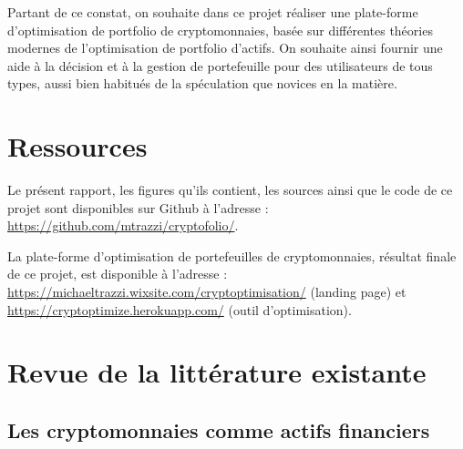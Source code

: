 \documentclass[a4paper, 10pt]{article}
\begin{document}
Partant de ce constat, on souhaite dans ce projet réaliser une plate-forme d’optimisation de portfolio de cryptomonnaies, basée sur différentes théories modernes de l'optimisation de portfolio d'actifs. On souhaite ainsi fournir une aide à la décision et à la gestion de portefeuille pour des utilisateurs de tous types, aussi bien habitués de la spéculation que novices en la matière.

\section*{Ressources}
\label{sec:ressources}

Le présent rapport, les figures qu'ils contient, les sources ainsi que le code de ce projet sont disponibles sur Github à l'adresse : \url{https://github.com/mtrazzi/cryptofolio/}.

La plate-forme d'optimisation de portefeuilles de cryptomonnaies, résultat finale de ce projet, est disponible à l'adresse : \url{https://michaeltrazzi.wixsite.com/cryptoptimisation/} (landing page) et \url{https://cryptoptimize.herokuapp.com/} (outil d'optimisation).

\newpage
\section{Revue de la littérature existante}

\subsection{Les cryptomonnaies comme actifs financiers}
\end{document}

